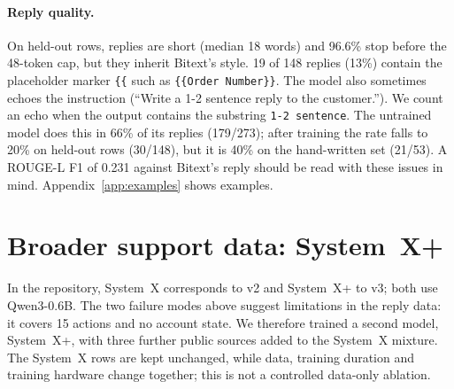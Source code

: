 \documentclass[11pt]{article}
\newcommand{\sysplus}{System~X+}
\begin{document}
\paragraph{Reply quality.}
On held-out rows, replies are short (median 18 words) and 96.6\% stop before the 48-token cap, but they inherit Bitext's style. 19 of 148 replies (13\%) contain the placeholder marker \texttt{\{\{} such as \texttt{\{\{Order Number\}\}}. The model also sometimes echoes the instruction (``Write a 1-2 sentence reply to the customer.''). We count an echo when the output contains the substring \texttt{1-2 sentence}. The untrained model does this in 66\% of its replies (179/273); after training the rate falls to 20\% on held-out rows (30/148), but it is 40\% on the hand-written set (21/53). A ROUGE-L F1 \citep{lin2004rouge} of 0.231 against Bitext's reply should be read with these issues in mind. Appendix~\ref{app:examples} shows examples.

\section{Broader support data: \sysplus}\label{sec:plus}

In the repository, System~X corresponds to v2 and \sysplus{} to v3; both use Qwen3-0.6B. The two failure modes above suggest limitations in the reply data: it covers 15 actions and no account state. We therefore trained a second model, \sysplus, with three further public sources added to the System~X mixture. The System~X rows are kept unchanged, while data, training duration and training hardware change together; this is not a controlled data-only ablation.
\end{document}
